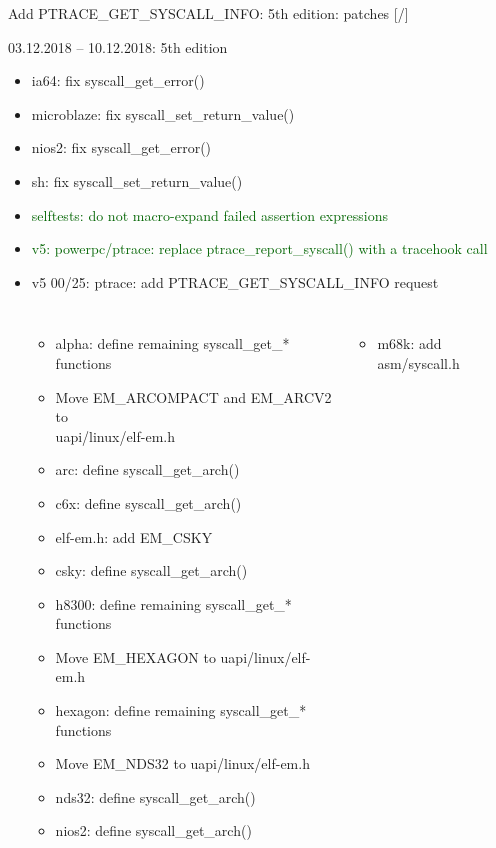 \documentclass[unicode,aspectratio=169,xcolor={table,dvipsnames,usernames}]{beamer}
\begin{document}
\begin{frame}{Add PTRACE\_GET\_SYSCALL\_INFO: 5th edition: patches \hfill [\insertframenumber/\inserttotalframenumber]}
\scriptsize
\begin{block}{03.12.2018 -- 10.12.2018: 5th edition}
\begin{itemize}
	\setlength{\itemsep}{0pt}
	\item ia64: fix syscall\_get\_error()
	\item microblaze: fix syscall\_set\_return\_value()
	\item nios2: fix syscall\_get\_error()
	\item sh: fix syscall\_set\_return\_value()
	\item \textcolor{darkgreen}{selftests: do not macro-expand failed assertion expressions}
	\item \textcolor{darkgreen}{v5: powerpc/ptrace: replace ptrace\_report\_syscall() with a tracehook call}
	\item v5 00/25: ptrace: add PTRACE\_GET\_SYSCALL\_INFO request
	\setlength{\itemsep}{0pt}
	\begin{columns}
		\column{6cm}
			\begin{itemize}
				\tiny
				\setlength{\itemsep}{0pt}
				\item alpha: define remaining syscall\_get\_* functions
				\item Move EM\_ARCOMPACT and EM\_ARCV2 to \\ uapi/linux/elf-em.h
				\item arc: define syscall\_get\_arch()
				\item c6x: define syscall\_get\_arch()
				\item elf-em.h: add EM\_CSKY
				\item csky: define syscall\_get\_arch()
				\item h8300: define remaining syscall\_get\_* functions
				\item Move EM\_HEXAGON to uapi/linux/elf-em.h
				\item hexagon: define remaining syscall\_get\_* functions
				\item Move EM\_NDS32 to uapi/linux/elf-em.h
				\item nds32: define syscall\_get\_arch()
				\item nios2: define syscall\_get\_arch()
			\end{itemize}
		\column{7cm}
			\begin{itemize}
				\tiny
				\setlength{\itemsep}{0pt}
				\item m68k: add asm/syscall.h

\end{itemize}
\end{columns}
\end{itemize}
\end{block}
\end{frame}
\end{document}
